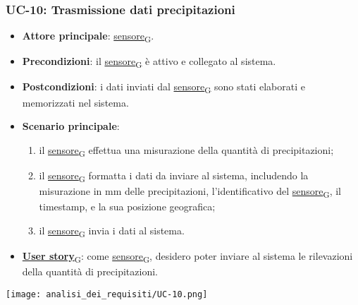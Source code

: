 \newpage
\subsubsection{UC-10: Trasmissione dati precipitazioni}
\begin{itemize}
	\item \textbf{Attore principale}: \href{https://7last.github.io/docs/pb/documentazione-interna/glossario\#sensore}{sensore\textsubscript{G}}.
	\item \textbf{Precondizioni}: il \href{https://7last.github.io/docs/pb/documentazione-interna/glossario\#sensore}{sensore\textsubscript{G}} è attivo e collegato al sistema.
	\item \textbf{Postcondizioni}: i dati inviati dal \href{https://7last.github.io/docs/pb/documentazione-interna/glossario\#sensore}{sensore\textsubscript{G}} sono stati elaborati e memorizzati nel sistema.
	\item \textbf{Scenario principale}:
	      \begin{enumerate}
		      \item il \href{https://7last.github.io/docs/pb/documentazione-interna/glossario\#sensore}{sensore\textsubscript{G}} effettua una misurazione della quantità di precipitazioni;
		      \item il \href{https://7last.github.io/docs/pb/documentazione-interna/glossario\#sensore}{sensore\textsubscript{G}} formatta i dati da inviare al sistema, includendo la misurazione in mm delle precipitazioni, l'identificativo del \href{https://7last.github.io/docs/pb/documentazione-interna/glossario\#sensore}{sensore\textsubscript{G}},
		            il timestamp, e la sua posizione geografica;
		      \item il \href{https://7last.github.io/docs/pb/documentazione-interna/glossario\#sensore}{sensore\textsubscript{G}} invia i dati al sistema.
	      \end{enumerate}
	\item \href{https://7last.github.io/docs/pb/documentazione-interna/glossario\#user-story}{\textbf{User story}\textsubscript{G}}: come \href{https://7last.github.io/docs/pb/documentazione-interna/glossario\#sensore}{sensore\textsubscript{G}}, desidero poter inviare al sistema le rilevazioni della quantità di precipitazioni.
\end{itemize}
\begin{center}
	\texttt{[image: analisi\_dei\_requisiti/UC-10.png]}
\end{center}

